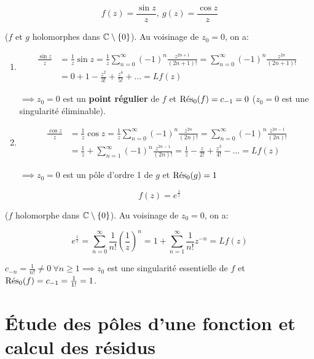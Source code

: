 \begin{example}[4]
    \[ f(z) = \frac{\sin z}{z},\ g(z) = \frac{\cos z}{z} \]
    
    ($f$ et $g$ holomorphes dans $\Cx \setminus \{0\}$).
    Au voisinage de $z_0 = 0$, on a:
    
    \begin{enumerate}[label=\alph*)]
        \item 
        \begin{align*}
        \frac{\sin z}{z} &= \frac{1}{z} \sin z = \frac{1}{z} \sum_{n = 0}^\infty (-1)^n \frac{z^{2n + 1}}{(2n + 1)!} = \sum_{n = 0}^\infty (-1)^n \frac{z^{2n}}{(2n + 1)!}
        \\&= 0 + 1 - \frac{z^2}{3!} + \frac{z^4}{5!} + \ldots = Lf(z)
        \end{align*}
        
        $\implies z_0 = 0$ est un \textbf{point régulier} de $f$ et $\Res_0(f) = c_{-1} = 0$ ($z_0 = 0$ est une singularité éliminable).
        
        \item 
        \begin{align*}
        \frac{\cos z}{z} &= \frac{1}{z} \cos z = \frac{1}{z} \sum_{n = 0}^\infty (-1)^n \frac{z^{2n}}{(2n)!} = \sum_{n = 0}^\infty (-1)^n \frac{z^{2n - 1}}{(2n)!}
        \\&= \frac{1}{z} + \sum_{n = 1}^\infty (-1)^n \frac{z^{2n - 1}}{(2n)!}
        = \frac{1}{z} - \frac{z}{2!} + \frac{z^3}{4!} - \ldots = Lf(z)
        \end{align*}
        
        $\implies z_0 = 0$ est un pôle d'ordre 1 de $g$ et $\Res_0(g) = 1$
    \end{enumerate}
\end{example}

\begin{example}[5]
    \[ f(z) = e^{\frac{1}{z}} \]
    
    ($f$ holomorphe dans $\Cx \setminus \{0\}$).
    Au voisinage de $z_0 = 0$, on a:
    
    \[
    e^{\frac{1}{z}} = \sum_{n=0}^\infty \frac{1}{n!} \left(\frac{1}{z}\right)^n = 1 + \sum_{n=1}^\infty \frac{1}{n!}z^{-n} = Lf(z)
    \]
    
    $c_{-n} = \frac{1}{n!} \neq 0 \ \forall n \geq 1 \implies z_0$ est une singularité essentielle de $f$ et $\Res_0(f) = c_{-1} = \frac{1}{1!} = 1$.
\end{example}


\section{Étude des pôles d'une fonction et calcul des résidus}

